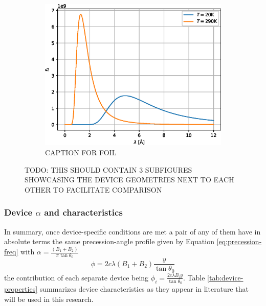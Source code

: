\documentclass{article}
\begin{document}
\begin{figure}[htbp]
	\begin{subfigure}[b]{0.3\textwidth}
		\centering
		\includegraphics[width=\textwidth]{source-spectrum}
		\caption{CAPTION FOR FOIL}
		\label{fig:precession-devices:foil}
	\end{subfigure}
	\caption{TODO: THIS SHOULD CONTAIN 3 SUBFIGURES SHOWCASING THE DEVICE GEOMETRIES NEXT TO EACH OTHER TO FACILITATE COMPARISON}
	\label{fig:precession-devices}
\end{figure}

\subsubsection{Device $\alpha$ and characteristics}
In summary, once device-specific conditions are met a pair of any of them have in absolute terms the same precession-angle profile given by Equation \eqref{eq:precession-freq} with $\alpha = \frac{(B_1 + B_2)}{\pi\tan\theta_0}$
\begin{equation}
	\phi = 2c\lambda (B_1 + B_2)\frac{y}{\tan\theta_0} \label{eq:device-prec}
\end{equation}
the contribution of each separate device being $\phi_i = \frac{2c\lambda B_i y}{\tan\theta_0}$. Table \ref{tab:device-properties} summarizes device characteristics as they appear in literature that will be used in this research.
\end{document}
